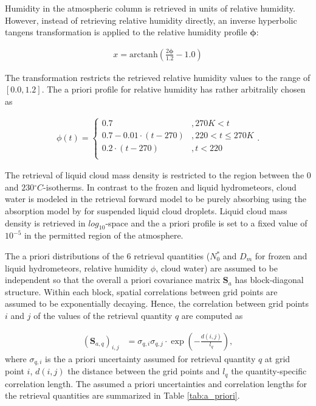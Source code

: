 \documentclass[journal abbreviation, manuscript]{copernicus}
\begin{document}
Humidity in the atmospheric column is retrieved in units of relative humidity.
However, instead of retrieving relative humidity directly, an inverse hyperbolic
tangens transformation is applied to the relative humidity profile $\mathbf{\phi}$:

\begin{align}
x = \text{arctanh}(\frac{2 \mathbf{\phi}}{1.2} - 1.0)
\end{align}

The transformation restricts the retrieved relative humidity values to
the range of $[0.0, 1.2]$. The a priori profile for relative humidity
has rather arbitralily chosen as

\begin{align}
\phi(t) = \begin{cases}
 0.7 &, 270\unit{K} < t \\
 0.7 - 0.01 \cdot (t - 270) & ,220 < t \leq  270\unit{K} \\
 0.2 \cdot (t - 270) & ,t < 220 \\
 \end{cases}.
\end{align}

The retrieval of liquid cloud mass density is restricted to the region
between the $0$ and $230\unit{^\circ C}$-isotherms. In contrast to the
frozen and liquid hydrometeors, cloud water is modeled in the retrieval
forward model to be purely absorbing using the absorption model by
\cite{liebe92} for suspended liquid cloud droplets. Liquid cloud mass density
is retrieved in $log_{10}$-space and the a priori profile is set to a fixed
value of $10^{-5}$ in the permitted region of the atmosphere.

The a priori distributions of the 6 retrieval quantities ($N_0^*$ and $D_m$
for frozen and liquid hydrometeors, relative humidity $\phi$, cloud water)
are assumed to be independent so that the overall a priori covariance matrix
$\mathbf{S}_a$ has block-diagonal structure. Within each block, spatial
correlations between grid points are assumed to be exponentially decaying.
Hence, the correlation between grid points $i$ and $j$ of the values of the
retrieval quantity $q$ are computed as

\begin{align}
\left ( \mathbf{S}_{a,q} \right )_{i, j} &= \sigma_{q,i} \sigma_{q,j}
 \cdot \exp ( -\frac{d(i, j)}{l_q}),
\end{align}
where $\sigma_{q, i}$ is the a priori uncertainty assumed for retrieval
quantity $q$ at grid point $i$, $d(i, j)$ the distance between the grid
points and $l_q$ the quantity-specific correlation length. The assumed
a priori uncertainties and correlation lengths for the retrieval quantities
are summarized in Table \ref{tab:a_priori}.
\end{document}
